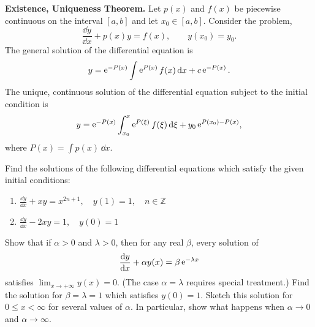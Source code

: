 \begin{Result}
  \label{first_order_inhom}
  \textbf{Existence, Uniqueness Theorem.}
  Let $p(x)$ and $f(x)$ be piecewise continuous on the interval $[a,b]$
  and let $x_0 \in [a,b]$.  Consider the problem,
  \[ 
  \frac{\dd y}{\dd x} + p(x) y = f(x), \qquad y(x_0) = y_0.
  \]
  The general solution of the differential equation is
  \[ 
  y = \mathop{\mathrm{e}}\nolimits^{-P(x)} \int \mathop{\mathrm{e}}\nolimits^{P(x)}f(x)\,\mathrm{d} x + c \mathop{\mathrm{e}}\nolimits^{-P(x)}.
  \]
  The unique, continuous solution of the differential equation 
  subject to the initial condition is
  \[
  y = \mathop{\mathrm{e}}\nolimits^{-P(x)}\int^x_{x_0} \mathop{\mathrm{e}}\nolimits^{P(\xi)}f(\xi)\,\mathrm{d} \xi + y_0 \mathop{\mathrm{e}}\nolimits^{P(x_0)-P(x)},
  \]
  where $P(x) = \int p(x)\,\dd x$.
\end{Result}









\begin{Exercise}
  \label{exercise dydx + x y = x 2n+1}
  Find the solutions of the following differential equations which satisfy the 
  given initial conditions:
  \begin{enumerate}
  \item
    $ \displaystyle
    \frac{\dd y}{\dd x} + x y = x^{2n+1}, \quad y(1) = 1, \quad n \in \mathbb{Z}
    $
  \item
    $ \displaystyle
    \frac{\dd y}{\dd x} - 2 x y = 1, \quad y(0) = 1
    $
  \end{enumerate}

\end{Exercise}






\begin{Exercise}
  \label{exercise dydx + alpha y = beta e}
  Show that if $\alpha > 0$ and $\lambda > 0$, then for any real $\beta$, 
  every solution of 
  \[
  \frac{\mathrm{d} y}{\mathrm{d} x} + \alpha y(x) = \beta \mathop{\mathrm{e}}\nolimits^{-\lambda x}
  \]
  satisfies $\lim_{x \to +\infty} y(x) = 0$.  (The case $\alpha = \lambda$
  requires special treatment.)  Find the solution for $\beta = \lambda = 1$
  which satisfies $y(0) = 1$.  Sketch this solution for $0 \leq x < \infty$
  for several values of $\alpha$.  In particular, show what happens when
  $\alpha \to 0$ and $\alpha \to \infty$.

\end{Exercise}










